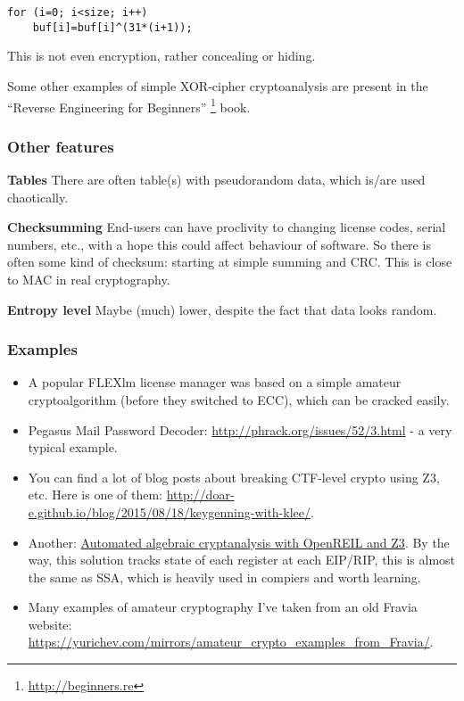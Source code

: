 \begin{lstlisting}
for (i=0; i<size; i++)
    buf[i]=buf[i]^(31*(i+1));
\end{lstlisting}

This is not even encryption, rather concealing or hiding.

Some other examples of simple XOR-cipher cryptoanalysis are present in the ``Reverse Engineering for Beginners''
\footnote{\url{http://beginners.re}} book.

\subsubsection{Other features}

\textbf{Tables} There are often table(s) with pseudorandom data, which is/are used chaotically.

\textbf{Checksumming} End-users can have proclivity to changing license codes, serial numbers, etc., with a hope
this could affect behaviour of software.
So there is often some kind of checksum: starting at simple summing and \ac{CRC}.
This is close to \ac{MAC} in real cryptography.

\textbf{Entropy level} Maybe (much) lower, despite the fact that data looks random.

\subsubsection{Examples}

\begin{itemize}

\item A popular FLEXlm license manager was based on a simple amateur cryptoalgorithm
(before they switched to \ac{ECC}), which can be cracked easily.

\item Pegasus Mail Password Decoder: \url{http://phrack.org/issues/52/3.html} -
a very typical example.

\item You can find a lot of blog posts about breaking \ac{CTF}-level crypto using Z3, etc.
Here is one of them: \url{http://doar-e.github.io/blog/2015/08/18/keygenning-with-klee/}.

\item Another: \href{http://blog.cr4.sh/2015/03/automated-algebraic-cryptanalysis-with.html}{Automated algebraic cryptanalysis with OpenREIL and Z3}.
By the way, this solution tracks state of each register at each EIP/RIP,
this is almost the same as \ac{SSA}, which is heavily used in compiers and worth learning.

\item Many examples of amateur cryptography I've taken from an old Fravia website:
\url{https://yurichev.com/mirrors/amateur_crypto_examples_from_Fravia/}.

\end{itemize}




